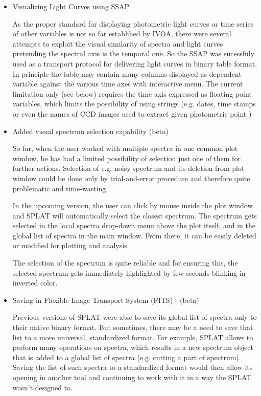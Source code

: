 \documentclass[final,authoryear,5p,times,twocolumn]{elsarticle}
\begin{document}
\begin{itemize}

\item Visualizing Light Curves using  SSAP

  As the proper standard for displaying photometric light curves or
  time series of other variables is not so far establihed by IVOA,
  there were several attempts to exploit the visual similarity of
  spectra and light curves pretending the spectral axis is the
  temporal one.  So the SSAP was sucessfuly used as a transport
  protocol for delivering light curves in binary table format. In
  principle the table may contain many columns displayed as dependent
  variable against the various time axes with interactive menu.  The
  current limitation only (see below) requires the time axis expressed
  as floating point variables, which limits the possibility of using
  strings (e.g. dates, time stamps or even the names of CCD images
  used to extract given photometric point )

\item Added visual spectrum selection capability (beta)

  So far, when the user worked with multiple spectra in one common
  plot window, he has had a limited possibility of selection just one
  of them for further actions. Selection of e.g. noisy spectrum and
  its deletion from plot window could be done only by trial-and-error
  procedure and therefore quite problematic and time-wasting.

  In the upcoming version, the user can click by mouse inside the plot
  window and SPLAT will automatically select the closest spectrum. The
  spectrum gets selected in the local spectra drop-down menu above the
  plot itself, and in the global list of spectra in the main
  window. From there, it can be easily deleted or modified for
  plotting and analysis.

  The selection of the spectrum is quite reliable and for ensuring
  this, the selected spectrum gets immediately highlighted by
  few-seconds blinking in inverted color.

\item Saving in Flexible Image Transport System (FITS) - (beta)

  Previous versions of SPLAT were able to save its global list of
  spectra only to their native binary format. But sometimes, there may
  be a need to save that list to a more universal, standardized
  format. For example, SPLAT allows to perform many operations on
  spectra, which results in a new spectrum object that is added to a
  global list of spectra (e.g. cutting a part of spectrum). Saving the
  list of such spectra to a standardized format would then allow its
  opening in another tool and continuing to work with it in a way the
  SPLAT wasn't designed to.


\end{itemize}
\end{document}
